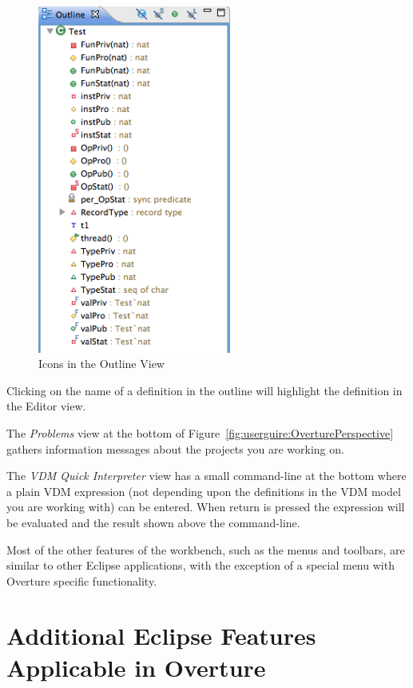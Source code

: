 \documentclass{overturerepchap}
\begin{document}
\begin{figure}[!htb]
\begin{center}
  \includegraphics[width=2.5in]{figures/OutlineIcons}
  \caption[labelInTOC]{Icons in the Outline View}
  \label{fig:OutlineIcons}
\end{center}
\end{figure}

Clicking on the name of a definition in the outline will highlight the
definition in the Editor view.

The \emph{Problems} view at the bottom of 
Figure~\ref{fig:userguire:OverturePerspective} gathers 
information messages about the projects you are
working on.

The \emph{VDM Quick Interpreter}
view has a small command-line at the bottom where a plain VDM expression
(not depending upon the definitions in the VDM model you are working with) can be
entered. When return is pressed the expression will be evaluated and
the result shown above the command-line.

Most of the other features of the workbench, such as the menus and
toolbars, are similar to other Eclipse applications, with the exception 
of a special menu with Overture specific functionality.

\section{Additional Eclipse Features Applicable in Overture}
\end{document}
